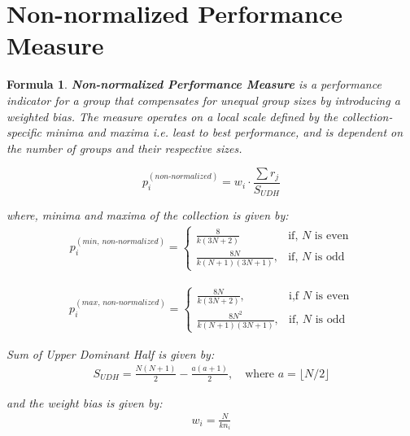 \documentclass[a4paper,fleqn,review]{cas-sc}
\newtheorem{theorem}{Formula}
\begin{document}
\section{Non-normalized Performance Measure}

\begin{theorem} \label{thm:non-normalized-performance-measure}
	\textbf{Non-normalized Performance Measure} is a performance indicator for a group that compensates for unequal group sizes by introducing a weighted bias. The measure operates on a local scale defined by the collection-specific minima and maxima i.e. least to best performance, and is dependent on the number of groups and their respective sizes.
	
	\begin{equation}
		p_i^{(non\text{-}normalized)} = w_i \cdot \frac{\sum r_j}{ S_{UDH} }
		\label{eq:non-normalized}
	\end{equation}
	
	where, minima and maxima of the collection is given by:
	\begin{align*}
	p_i^{(min, \, non\text{-}normalized)} = 
	\begin{cases}
			\frac{8}{k(3N + 2)}
			 & \text{if, } N \text{ is even} \\
			\frac{8N}{k (N+1)(3N+1)}, & \text{if, } N \text{ is odd}
	\end{cases}
	\end{align*}
	
	\begin{align*}
		p_i^{(max, \, non\text{-}normalized)} = 
		\begin{cases}
			\frac{8N}{k(3N + 2)}, & \text{i,f } N \text{ is even} \\
			\frac{8N^2}{k (N+1)(3N+1)}, & \text{if, } N \text{ is odd}
		\end{cases}
	\end{align*}
	
	Sum of Upper Dominant Half is given by:
	\begin{align*}
		S_{UDH} = \frac{N(N+1)}{2} - \frac{a(a+1)}{2}, \quad \text{where } a = \lfloor N/2 \rfloor
	\end{align*}
	
	and the weight bias is given by:
	\begin{align*}
		w_i = \frac{N}{k n_i}
	\end{align*}

	
\end{theorem}
\end{document}
